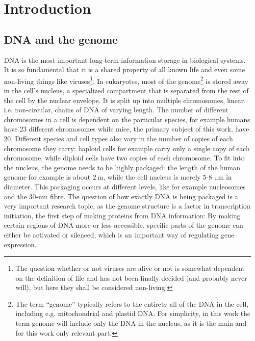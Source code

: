 \documentclass[a4paper,11pt,oneside,final,english,toc=bib]{scrbook}
\begin{document}

\tableofcontents
\clearpage

\mainmatter
\sloppy

% 
\chapter{Introduction} %
\label{cha:introduction}

\section{DNA and the genome} %
\label{sec:dna_and_genome}

DNA is the most important long-term information storage in biological systems. It is so fundamental that it is a shared property of all known life and even some non-living things like viruses\footnote{The question whether or not viruses are alive or not is somewhat dependent on the definition of life and has not been finally decided (and probably never will), but here they shall be considered non-living.}. In eukaryotes, most of the genome\footnote{The term \enquote{genome} typically refers to the entirety all of the DNA in the cell, including e.g. mitochondrial and plastid DNA. For simplicity, in this work the term genome will include only the DNA in the nucleus, as it is the main and for this work only relevant part.} is stored away in the cell's nucleus, a specialized compartment that is separated from the rest of the cell by the nuclear envelope. It is split up into multiple chromosomes, linear, i.e. non-circular, chains of DNA of varying length. The number of different chromosomes in a cell is dependent on the particular species, for example humans have 23 different chromosomes while mice, the primary subject of this work, have 20. Different species and cell types also vary in the number of copies of each chromosome they carry: haploid cells for example carry only a single copy of each chromosome, while diploid cells have two copies of each chromosome. To fit into the nucleus, the genome needs to be highly packaged: the length of the human genome for example is about \(\SI{2}{\metre}\), while the cell nucleus is merely \(5\)-\(8\) \(\si{\micro\metre}\) in diameter. This packaging occurs at different levels, like for example nucleosomes and the 30-nm fibre. The question of how exactly DNA is being packaged is a very important research topic, as the genome structure is a factor in transcription initiation, the first step of making proteins from DNA information: By making certain regions of DNA more or less accessible, specific parts of the genome can either be activated or silenced, which is an important way of regulating gene expression. \cite{uzman_essential_2010}
\end{document}
